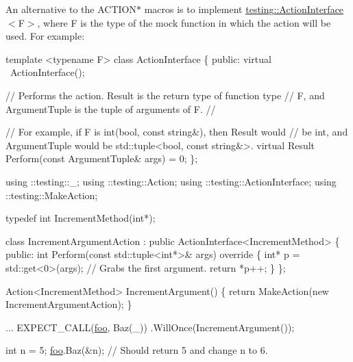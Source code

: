 An alternative to the {\ttfamily A\+C\+T\+I\+O\+N$\ast$} macros is to implement {\ttfamily \mbox{\hyperlink{classtesting_1_1ActionInterface}{testing\+::\+Action\+Interface}}$<$F$>$}, where {\ttfamily F} is the type of the mock function in which the action will be used. For example\+:


\begin{DoxyCode}
\textcolor{keyword}{template} <\textcolor{keyword}{typename} F>
\textcolor{keyword}{class }ActionInterface \{
 \textcolor{keyword}{public}:
  \textcolor{keyword}{virtual} ~ActionInterface();

  \textcolor{comment}{// Performs the action.  Result is the return type of function type}
  \textcolor{comment}{// F, and ArgumentTuple is the tuple of arguments of F.}
  \textcolor{comment}{//}

  \textcolor{comment}{// For example, if F is int(bool, const string&), then Result would}
  \textcolor{comment}{// be int, and ArgumentTuple would be std::tuple<bool, const string&>.}
  \textcolor{keyword}{virtual} Result Perform(\textcolor{keyword}{const} ArgumentTuple& args) = 0;
\};
\end{DoxyCode}



\begin{DoxyCode}
using ::testing::\_;
using ::testing::Action;
using ::testing::ActionInterface;
using ::testing::MakeAction;

\textcolor{keyword}{typedef} \textcolor{keywordtype}{int} IncrementMethod(\textcolor{keywordtype}{int}*);

\textcolor{keyword}{class }IncrementArgumentAction : \textcolor{keyword}{public} ActionInterface<IncrementMethod> \{
 \textcolor{keyword}{public}:
  \textcolor{keywordtype}{int} Perform(\textcolor{keyword}{const} std::tuple<int*>& args)\textcolor{keyword}{ override }\{
    \textcolor{keywordtype}{int}* p = std::get<0>(args);  \textcolor{comment}{// Grabs the first argument.}
    \textcolor{keywordflow}{return} *p++;
  \}
\};

Action<IncrementMethod> IncrementArgument() \{
  \textcolor{keywordflow}{return} MakeAction(\textcolor{keyword}{new} IncrementArgumentAction);
\}

...
  EXPECT\_CALL(\mbox{\hyperlink{namespacefoo}{foo}}, Baz(\_))
      .WillOnce(IncrementArgument());

  \textcolor{keywordtype}{int} n = 5;
  \mbox{\hyperlink{namespacefoo}{foo}}.Baz(&n);  \textcolor{comment}{// Should return 5 and change n to 6.}
\end{DoxyCode}


